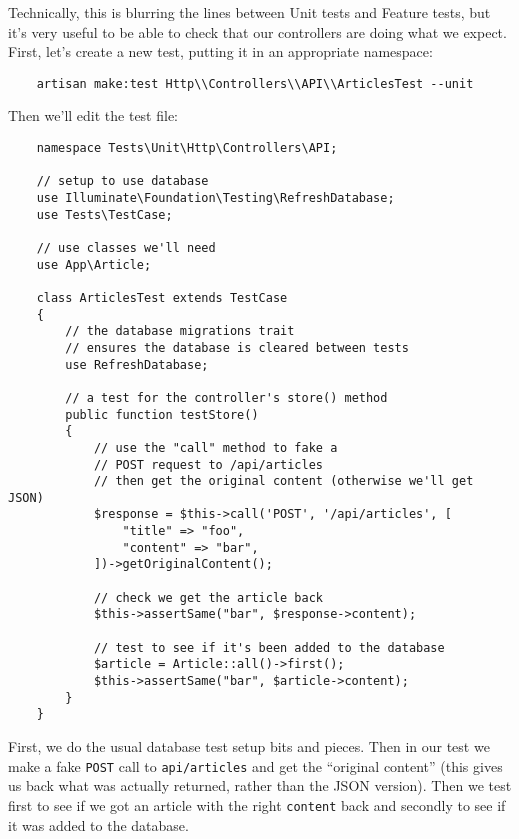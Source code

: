 Technically, this is blurring the lines between Unit tests and Feature tests, but it's very useful to be able to check that our controllers are doing what we expect.
\\

First, let's create a new test, putting it in an appropriate namespace:

\begin{verbatim}
    artisan make:test Http\\Controllers\\API\\ArticlesTest --unit
\end{verbatim}

Then we'll edit the test file:

\begin{verbatim}
    namespace Tests\Unit\Http\Controllers\API;

    // setup to use database
    use Illuminate\Foundation\Testing\RefreshDatabase;
    use Tests\TestCase;

    // use classes we'll need
    use App\Article;

    class ArticlesTest extends TestCase
    {
        // the database migrations trait
        // ensures the database is cleared between tests
        use RefreshDatabase;

        // a test for the controller's store() method
        public function testStore()
        {
            // use the "call" method to fake a
            // POST request to /api/articles
            // then get the original content (otherwise we'll get JSON)
            $response = $this->call('POST', '/api/articles', [
                "title" => "foo",
                "content" => "bar",
            ])->getOriginalContent();

            // check we get the article back
            $this->assertSame("bar", $response->content);

            // test to see if it's been added to the database
            $article = Article::all()->first();
            $this->assertSame("bar", $article->content);
        }
    }
\end{verbatim}

First, we do the usual database test setup bits and pieces. Then in our test we make a fake \texttt{POST} call to \texttt{api/articles} and get the ``original content'' (this gives us back what was actually returned, rather than the JSON version). Then we test first to see if we got an article with the right \texttt{content} back and secondly to see if it was added to the database.
\\

